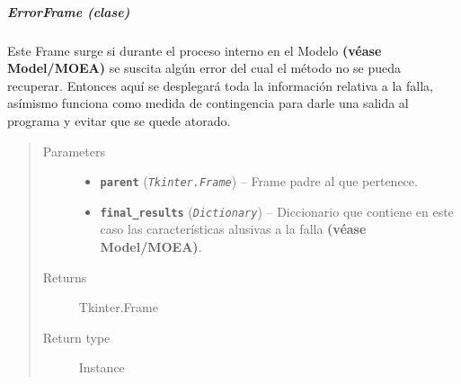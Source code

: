\documentclass[class=report, crop=false]{standalone}
\begin{document}
\subparagraph{ErrorFrame (clase)}
\label{sec:a_3_3_3_1_3}
\begin{fulllineitems}

\begin{DUlineblock}{0em}
\item[] Este Frame surge si durante el proceso 
interno en el Modelo \textbf{(véase Model/MOEA)} se 
suscita algún error del cual el método no se pueda 
recuperar.\break
Entonces aquí se desplegará toda la información 
relativa a la falla, asímismo funciona como medida 
de contingencia para darle una salida al programa 
y evitar que se quede atorado.
\end{DUlineblock}

\begin{quote}\begin{description}
\item[{Parameters}] \leavevmode\begin{itemize}
\item \textbf{\texttt{parent}} (\emph{\texttt{Tkinter.Frame}}) -- Frame padre al que pertenece.
\item \textbf{\texttt{final\_results}} (\emph{\texttt{Dictionary}}) -- Diccionario que contiene en este caso las características alusivas a la falla \textbf{(véase Model/MOEA)}.
\end{itemize}

\item[{Returns}] \leavevmode
Tkinter.Frame
\item[{Return type}] \leavevmode
Instance
\end{description}\end{quote}

\end{fulllineitems}

\end{document}
